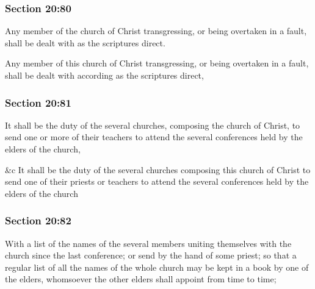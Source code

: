 	\subsubsection{Section 20:80} %
		\label{DC20-80}

		Any member of the church of Christ transgressing, or being overtaken in a fault, shall be dealt with as the scriptures direct.

		\begin{framed}
		\scriptsize
			\begin{compactdesc}
				\item[JSP] Any member of this church of Christ transgressing, or being overtaken in a fault, shall be dealt with according as the scriptures direct, 
				\item[RB1] 
				\item[BC] 
			\end{compactdesc}
		\end{framed}

	\subsubsection{Section 20:81} %
		\label{DC20-81}

		It shall be the duty of the several churches, composing the church of Christ, to send one or more of their teachers to attend the several conferences held by the elders of the church,

		\begin{framed}
		\scriptsize
			\begin{compactdesc}
				\item[JSP] \&c It shall be the duty of the several churches composing this church of Christ to send one of their priests or teachers to attend the several conferences held by the elders of the church 
				\item[RB1] 
				\item[BC] 
			\end{compactdesc}
		\end{framed}

	\subsubsection{Section 20:82} %
		\label{DC20-82}

		With a list of the names of the several members uniting themselves with the church since the last conference; or send by the hand of some priest; so that a regular list of all the names of the whole church may be kept in a book by one of the elders, whomsoever the other elders shall appoint from time to time;


